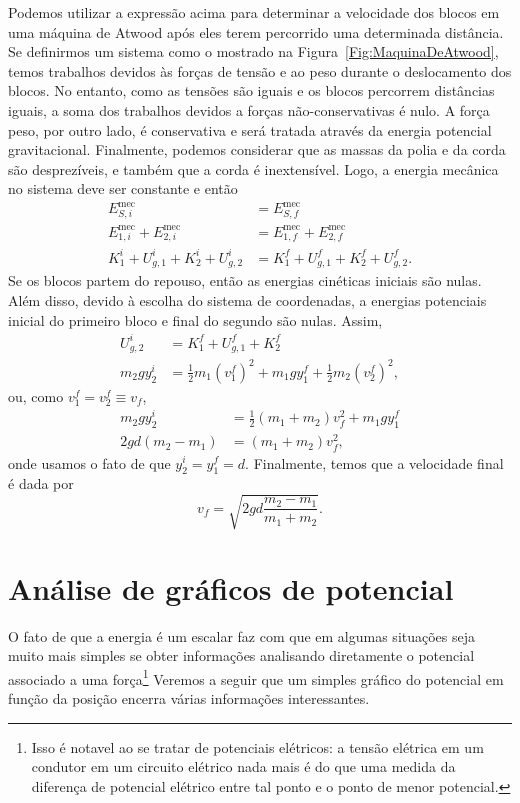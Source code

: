 Podemos utilizar a expressão acima para determinar a velocidade dos blocos em uma máquina de Atwood após eles terem percorrido uma determinada distância. Se definirmos um sistema como o mostrado na Figura~\ref{Fig:MaquinaDeAtwood}, temos trabalhos devidos às forças de tensão e ao peso durante o deslocamento dos blocos. No entanto, como as tensões são iguais e os blocos percorrem distâncias iguais, a soma dos trabalhos devidos a forças não-conservativas é nulo. A força peso, por outro lado, é conservativa e será tratada através da energia potencial gravitacional. Finalmente, podemos considerar que as massas da polia e da corda são desprezíveis, e também que a corda é inextensível. Logo, a energia mecânica no sistema deve ser constante e então
\begin{align}
    E_{S,i}^{\text{mec}} &= E_{S,f}^{\text{mec}} \\
    E_{1,i}^{\text{mec}} + E_{2,i}^{\text{mec}} &= E_{1,f}^{\text{mec}} + E_{2,f}^{\text{mec}} \\
    K_1^i + U_{g, 1}^i + K_2^i + U_{g, 2}^i &= K_1^f + U_{g, 1}^f + K_2^f + U_{g, 2}^f.
\end{align}
%
Se os blocos partem do repouso, então as energias cinéticas iniciais são nulas. Além disso, devido à escolha do sistema de coordenadas, a energias potenciais inicial do primeiro bloco  e final do segundo são nulas. Assim,
\begin{align}
    U_{g, 2}^i &= K_1^f + U_{g, 1}^f + K_2^f \\
    m_2gy_2^i &= \frac{1}{2} m_1 (v_1^f)^2 + m_1gy_1^f + \frac{1}{2} m_2 (v_2^f)^2,
\end{align}
%
ou, como $v_1^f = v_2^f \equiv v_f$,
\begin{align}
    m_2gy_2^i &= \frac{1}{2} (m_1 + m_2) v_f^2 + m_1gy_1^f \\
    2gd(m_2-m_1) &= (m_1+m_2) v_f^2,
\end{align}
%
onde usamos o fato de que $y_2^i = y_1^f = d$. Finalmente, temos que a velocidade final é dada por
\begin{equation}
    v_f = \sqrt{2gd\frac{m_2-m_1}{m_1+m_2}}.
\end{equation}

\section{Análise de gráficos de potencial}

O fato de que a energia é um escalar faz com que em algumas situações seja muito mais simples se obter informações analisando diretamente o potencial associado a uma força\footnote[][-8cm]{Isso é notavel ao se tratar de potenciais elétricos: a tensão elétrica em um condutor em um circuito elétrico nada mais é do que uma medida da diferença de potencial elétrico entre tal ponto e o ponto de menor potencial.} Veremos a seguir que um simples gráfico do potencial em função da posição encerra várias informações interessantes.

